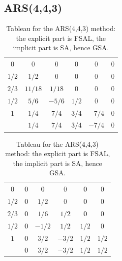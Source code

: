 \documentclass{article}
\begin{document}
\subsection{ARS(4,4,3)}
\begin{table}[H]
    \centering
    \begin{tabular}{c|ccccc}
        $0$ & $0$ & $0$ & $0$ & $0$ & $0$  \\
        $1/2$ & $1/2$ & $0$ & $0$ & $0$ & $0$   \\
        $2/3$ & $11/18$ & $1/18$ & $0$ & $0$ & $0$   \\
        $1/2$ & $5/6$ & $-5/6$ & $1/2$ & $0$ & $0$   \\
        $1$ & $1/4$ & $7/4$ & $3/4$ & $-7/4$ & $0$    \\
        \hline
        & $1/4$ & $7/4$ & $3/4$ & $-7/4$ & $0$   \\
    \end{tabular}
    \quad
    \begin{tabular}{c|ccccc}
        $0$ & $0$ & $0$ & $0$ & $0$ & $0$ \\
        $1/2$ & $0$  & $1/2$ & $0$ & $0$ & $0$ \\
        $2/3$ & $0$  & $1/6$ & $1/2$ & $0$ & $0$ \\
        $1/2$ & $0$  & $-1/2$ & $1/2$ & $1/2$ & $0$ \\
        $1$  & $0$  & $3/2$ & $-3/2$ & $1/2$ & $1/2$  \\
        \hline
        & $0$  & $3/2$ & $-3/2$ & $1/2$ & $1/2$ \\
    \end{tabular}
    \caption{Tableau for the ARS(4,4,3) method: the explicit part is FSAL, the implicit part is SA, hence GSA.}
    \label{tab:ARS443}
\end{table}

\end{document}
